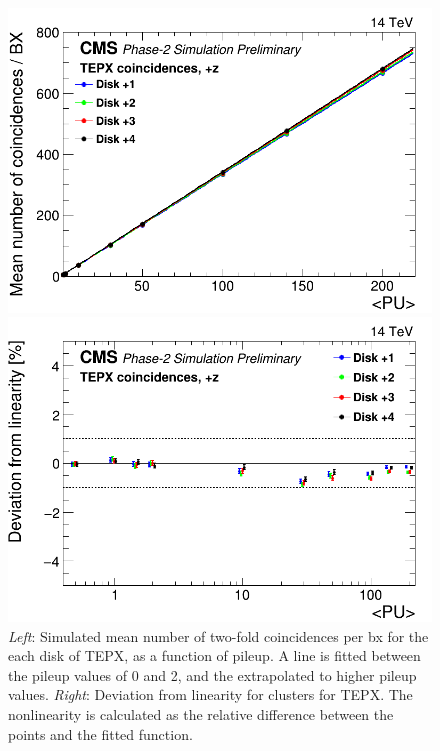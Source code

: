 \begin{center}
    \begin{figure}[H]
\begin{minipage}[b]{0.5\linewidth}
        \centering
        \includegraphics[scale=0.25]{Chapter4/plots/TEPX_coincidences_Linearity.png}
\end{minipage}
\begin{minipage}[b]{0.5\linewidth}
        \centering
        \includegraphics[scale=0.25]{Chapter4/plots/TEPX_coincidences_Linearity_residuals.png}
\end{minipage}
    \caption[Linearity of TEPX for two-fold coincidences.]{\textit{Left}: Simulated mean number of two-fold coincidences per bx for the each disk of TEPX, as a function of pileup. A line is fitted between the pileup values of 0 and 2, and the extrapolated to higher pileup values. \textit{Right}: Deviation from linearity for clusters for TEPX. The nonlinearity is calculated as the relative difference between the points and the fitted function.}
    \label{lin3}
\end{figure}
\end{center}
